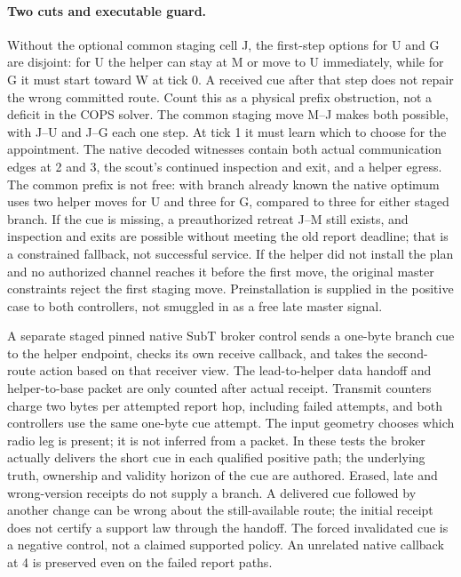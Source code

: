 \documentclass[11pt]{article}
\begin{document}
\paragraph{Two cuts and executable guard.}
Without the optional common staging cell J, the first-step options
for U and G are disjoint: for U the helper can stay at M or move
to U immediately, while for G it must start toward W at tick 0.
A received cue after that step does not repair the wrong committed
route. Count this as a physical prefix obstruction, not a deficit
in the COPS solver. The common staging move M--J makes both possible,
with J--U and J--G each one step. At tick 1 it must learn which
to choose for the appointment. The native decoded witnesses
contain both actual communication edges at 2 and 3, the scout's
continued inspection and exit, and a helper egress. The common prefix is not free: with branch
already known the native optimum uses two helper moves for U and
three for G, compared to three for either staged branch. If the cue
is missing, a preauthorized retreat J--M still exists, and
inspection and exits are possible without meeting the old report
deadline; that is a constrained fallback, not successful service.
If the helper did not install the plan and no authorized channel
reaches it before the first move, the original master constraints
reject the first staging move. Preinstallation is supplied in
the positive case to both controllers, not smuggled in as a free
late master signal.

A separate staged pinned native SubT broker control sends a one-byte
branch cue to the helper endpoint, checks its own receive callback,
and takes the second-route action based on that receiver view.
The lead-to-helper data handoff and helper-to-base packet are only
counted after actual receipt. Transmit counters charge two bytes
per attempted report hop, including failed attempts, and both
controllers use the same one-byte cue attempt. The input geometry chooses which radio
leg is present; it is not inferred from a packet. In these tests the
broker actually delivers the short cue in each qualified positive
path; the underlying truth, ownership and validity horizon of the
cue are authored. Erased, late and wrong-version receipts do not
supply a branch. A delivered cue followed by another change can
be wrong about the still-available route; the initial receipt does
not certify a support law through the handoff. The forced invalidated
cue is a negative control, not a claimed supported policy.
An unrelated native callback at 4 is preserved even on the
failed report paths.
\end{document}
